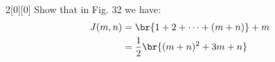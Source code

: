 \documentclass{article}
\begin{document}
\begin{hw}{2}[0][0]
	Show that in Fig. 32 we have:
	\begin{align*}
		J(m,n) &= \br{1 + 2 + \cdots + (m+n)} + m \\
		&= \frac{1}{2}\br{(m+n)^{2} + 3m + n}
	\end{align*}
\end{hw}
\begin{solution}
	\begin{comment}
		To begin with, let us define $I: \omega \times \omega \rightarrow \omega \times \omega$ to be as follows:
		\begin{equation*}
			\ang{m,n} \mapsto \begin{cases}
				\ang{m+1, n-1} & n \neq 0 \\
				\ang{0, m+1} & n = 0
			\end{cases}
		\end{equation*}
		
		Then, let $f: \omega \rightarrow \omega \times \omega$ to be defined as:
		\begin{align*}
			f(0) &= \ang{0,0} \\
			f(n^{+}) &= I(f(n))
		\end{align*} 
		
		Now, for $J$ to indeed be a bijection, we require that the following holds:
		\begin{enumerate}
			\item $J \circ f = 1_\omega$
			\item $f \circ J = 1_{\omega \times \omega}$
		\end{enumerate}
		
		First, we will show that $J\circ f = 1_\omega$.
		\begin{innerproof}
			We proceed by induction on $n$.
			
			Observe that $(J \circ f)(0) = 0$. So, we now suppose that our claim holds for $n$, and we look at $n^{+}$.
			
			We observe that $(J \circ f)(n^{+}) = J\circ I(f(n))$. Then, for $b \neq 0$ we have:
			\begin{align*}
				J \circ I(f(n)) &= g(I(\ang{a,b})) \\
				&= \dfrac{1}{2}\pr{ \pr{a+1+b-1}^{2} + 3(a+1) + (b-1)} \\
				&= J(\ang{a,b}) + 1 \\
				&= n + 1 \\
				&= n^{+}
			\end{align*}
			

\end{comment}
\end{solution}
\end{document}
